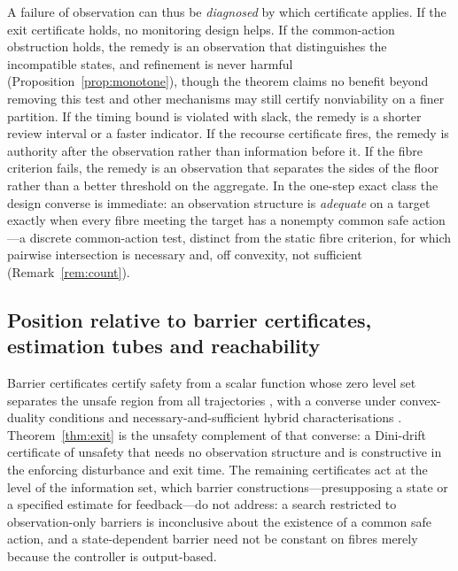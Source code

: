A failure of observation can thus be \emph{diagnosed} by which certificate applies. If the exit certificate holds, no monitoring design helps. If the common-action obstruction holds, the remedy is an observation that distinguishes the incompatible states, and refinement is never harmful (Proposition~\ref{prop:monotone}), though the theorem claims no benefit beyond removing this test and other mechanisms may still certify nonviability on a finer partition. If the timing bound is violated with slack, the remedy is a shorter review interval or a faster indicator. If the recourse certificate fires, the remedy is authority after the observation rather than information before it. If the fibre criterion fails, the remedy is an observation that separates the sides of the floor rather than a better threshold on the aggregate. In the one-step exact class the design converse is immediate: an observation structure is \emph{adequate} on a target exactly when every fibre meeting the target has a nonempty common safe action---a discrete common-action test, distinct from the static fibre criterion, for which pairwise intersection is necessary and, off convexity, not sufficient (Remark~\ref{rem:count}).

\subsection{Position relative to barrier certificates, estimation tubes and reachability}\label{sec:position}

Barrier certificates certify safety from a scalar function whose zero level set separates the unsafe region from all trajectories \citep{prajna2004,prajna2007}, with a converse under convex-duality conditions \citep{prajna2005} and necessary-and-sufficient hybrid characterisations \citep{maghenem2019}. Theorem~\ref{thm:exit} is the unsafety complement of that converse: a Dini-drift certificate of unsafety that needs no observation structure and is constructive in the enforcing disturbance and exit time. The remaining certificates act at the level of the information set, which barrier constructions---presupposing a state or a specified estimate for feedback---do not address: a search restricted to observation-only barriers is inconclusive about the existence of a common safe action, and a state-dependent barrier need not be constant on fibres merely because the controller is output-based.

